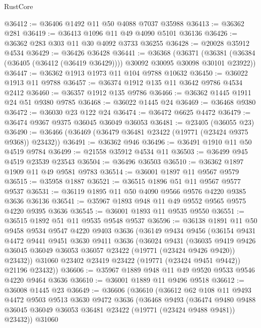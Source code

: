 \begin{lexlean}{RustCore}
\begin{coremodule}
@36412 := @36406 @1492 @11 @50 @4088 @7037 @35988
@36413 := @36362 @281
@36419 := @36413 @1096 @11 @49 @4090 @5101 @36136
@36426 := @36362 @283 @303 @11 @30 @4092 @3733 @36255
@36428 := @20028 @35912 @4534
@36429 := @36426 @36428
@36441 := @36368
    (@36371 (@36381 (@36384 (@36405 (@36412 (@36419 @36429)))) @30092 @30095 @30098 @30101 @23922))
@36447 := @36362 @1913 @1973 @11 @104 @9788 @10632
@36450 := @36022 @1913 @11 @9788
@36457 := @36374 @1912 @135 @11 @3642 @9786 @4534 @2412
@36460 := @36357 @1912 @135 @9786
@36466 := @36362 @1445 @1911 @24 @51 @9380 @9785
@36468 := @36022 @1445 @24
@36469 := @36468 @9380
@36472 := @36030 @23 @122 @24
@36474 := @36472 @6625 @4472
@36479 := @36474 @9367 @9375 @36045 @36049 @36053
@36481 := @23405 (@36055 @23)
@36490 := @36466 (@36469 (@36479 @36481 @23422 (@19771 (@23424 @9375 @9368)) @23432))
@36491 := @36362 @946
@36496 := @36491 @1910 @11 @50 @4519 @9784
@36499 := @21558 @35912 @4534 @11
@36503 := @36499 @945 @4519 @23539 @23543
@36504 := @36496 @36503
@36510 := @36362 @1897 @1909 @11 @49 @9581 @9783
@36514 := @36001 @1897 @11 @9567 @9579
@36515 := @35958 @1887
@36521 := @36515 @1896 @51 @11 @9567 @9577 @9537
@36531 := @36119 @1895 @11 @50 @4090 @9566 @9576 @4220 @9385 @3636 @36136
@36541 := @35967 @1893 @948 @11 @49 @9552 @9565 @9575 @4220 @9395 @3636
@36545 := @36001 @1893 @11 @9535 @9550
@36551 := @36515 @1892 @51 @11 @9535 @9548 @9537
@36596 := @36138
    @1891
    @11
    @50
    @9458
    @9534
    @9547
    @4220
    @9403
    @3636
    (@36149
      @9434
      @9456
      (@36154
        @9431
        @4472
        @9441
        @9451
        @3630
        @9411
        @3636
        (@36024
          @9431
          (@36035
            @9419
            @9426
            @36045
            @36049
            @36053
            @36057
            @23422
            (@19771 (@23424 @9426 @9420))
            @23432))
        @31060
        @23402
        @23419
        @23422
        (@19771 (@23424 @9451 @9442))
        @21196
        @23432))
@36606 := @35967 @1889 @948 @11 @49 @9520 @9533 @9546 @4220 @9464 @3636
@36610 := @36001 @1889 @11 @9496 @9518
@36612 := @36008 @1445 @23
@36649 := @36606
    (@36610
      (@36612
        @62
        @108
        @11
        @9493
        @4472
        @9503
        @9513
        @3630
        @9472
        @3636
        (@36468
          @9493
          (@36474
            @9480
            @9488
            @36045
            @36049
            @36053
            @36481
            @23422
            (@19771 (@23424 @9488 @9481))
            @23432))
        @31060

\end{coremodule}
\end{lexlean}

